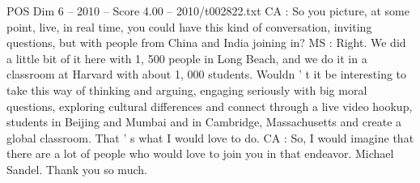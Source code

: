 \begin{textsample}{POS Dim 6 – 2010 – Score 4.00 – 2010/t002822.txt}
CA : So you picture, at some point, live, in real time, you could have this kind of conversation, inviting questions, but with people from China and India joining in?
MS : Right.
We did a little bit of it here with 1, 500 people in Long Beach, and we do it in a classroom at Harvard with about 1, 000 students.
Wouldn ' t it be interesting to take this way of thinking and arguing, engaging seriously with big moral questions, exploring cultural differences and connect through a live video hookup, students in Beijing and Mumbai and in Cambridge, Massachusetts and create a global classroom.
That ' s what I would love to do.
CA : So, I would imagine that there are a lot of people who would love to join you in that endeavor.
Michael Sandel.
Thank you so much.

\end{textsample}
